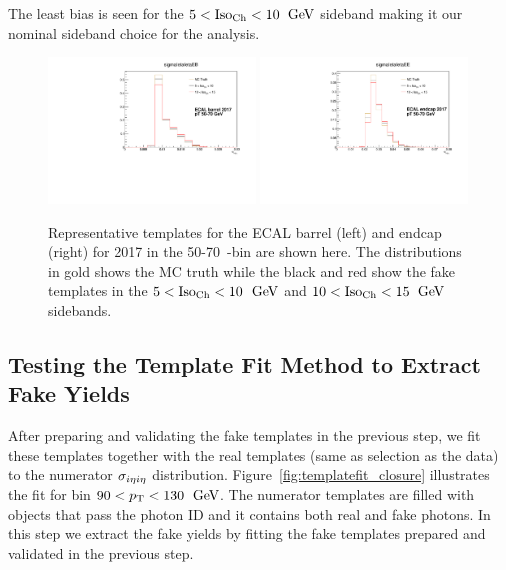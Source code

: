 
The least bias is seen for the $5 < \text{Iso}_{\text{Ch}} < 10$ $\,\text{Ge\hspace{-.08em}V}$ sideband making it our nominal sideband choice for the analysis.


\begin{figure}[!htbp]
  \centering
  \includegraphics[width=0.49\textwidth]{fig/MCtemplates_pT50To70EB2017.pdf}
  \includegraphics[width=0.49\textwidth]{fig/MCtemplates_pT50To70EE2017.pdf}
  \caption{Representative \sieie templates for the ECAL barrel (left) and endcap (right) for 2017 in the 50-70~\GeV \pt-bin are shown here. The distributions in gold shows the MC truth while the black and red show the fake templates in the $5 < \text{Iso}_{\text{Ch}} < 10$ $\,\text{Ge\hspace{-.08em}V}$ and $10 < \text{Iso}_{\text{Ch}} < 15$ $\,\text{Ge\hspace{-.08em}V}$ sidebands.}
  \label{fig:template_comparisons}
\end{figure}

\subsection{Testing the Template Fit Method to Extract Fake Yields}

After preparing and validating the fake templates in the previous step, we fit these templates together with the real templates (same as selection as the data) to the numerator $\sigma_{i\eta i\eta}$ distribution. Figure~\ref{fig:templatefit_closure} illustrates the fit for \pt bin $90 < p_{\mathrm{T}} < 130$ $\,\text{Ge\hspace{-.08em}V}$. The numerator templates are filled with objects that pass the photon ID and it contains both real and fake photons. In this step we extract the fake yields by fitting the fake templates prepared and validated in the previous step.

